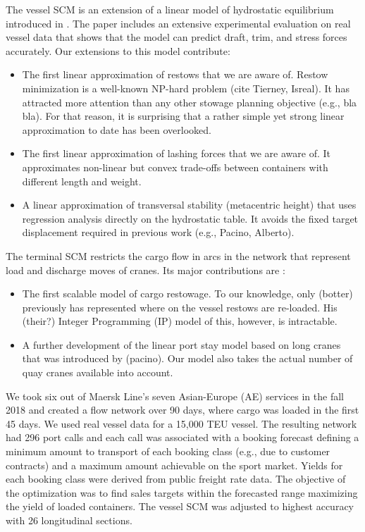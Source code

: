 	The vessel SCM is an extension of a linear model of hydrostatic equilibrium introduced in \citep{iccl18}. 
	The paper includes an extensive experimental evaluation on real vessel data that shows that the model can predict draft, trim, and stress forces accurately. Our extensions to this model contribute:
\begin{itemize}

\item The first linear approximation of restows that we are aware of. Restow minimization is a well-known NP-hard problem (cite Tierney, Isreal). It has attracted more attention than any other stowage planning objective  (e.g., bla bla). For that reason, it is surprising that a rather simple yet strong linear approximation to date has been overlooked. 

\item The first linear approximation of lashing forces that we are aware of. It approximates non-linear but convex trade-offs between containers with different length and weight. 
  
\item A linear approximation of transversal stability (metacentric height) that uses regression analysis directly on the hydrostatic table. It avoids the fixed target displacement required in previous work (e.g., Pacino, Alberto).
  
\end{itemize}

The terminal SCM restricts the cargo flow in arcs in the network that represent load and discharge moves of cranes. Its major contributions are : 
\begin{itemize}

\item The first scalable model of cargo restowage. To our knowledge, only (botter) previously has represented where on the vessel restows are re-loaded. His (their?) Integer Programming (IP) model of this, however, is intractable.

\item A further development of the linear port stay model based on long cranes that was introduced by (pacino). Our model also takes the actual number of quay cranes available into account.    

\end{itemize}

We took six out of Maersk Line's seven Asian-Europe (AE) services in the fall 2018 and created a flow network over 90 days, where cargo was loaded in the first 45 days. We used real vessel data for a 15,000 TEU vessel. The resulting network had 296 port calls and each call was associated with a booking forecast defining a minimum amount to transport of each booking class (e.g., due to customer contracts) and a maximum amount achievable on the sport market. Yields for each booking class were derived from public freight rate data. The objective of the optimization was to find sales targets within the forecasted range maximizing the yield of loaded containers. The vessel SCM was adjusted to highest accuracy with 26 longitudinal sections. 

